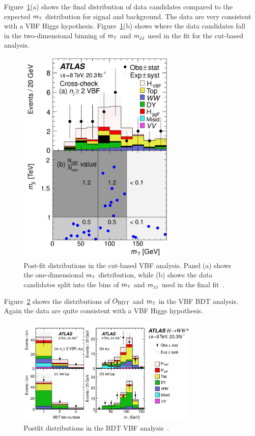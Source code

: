 Figure~\ref{fig:vbf_cb_mt}(a) shows the final distribution of data candidates compared to the expected $m_{\textrm{\footnotesize\sc t}}$ distribution for signal and background. The data are very consistent with a VBF Higgs hypothesis. Figure~\ref{fig:vbf_cb_mt}(b) shows where the data candidates fall in the two-dimensional binning of $m_{\textrm{\footnotesize\sc t}}$ and $m_{jj}$ used in the fit for the cut-based analysis. 
%
\begin{figure}[h!]
  \centering
  \captionsetup{justification=centering}
  \includegraphics[width=0.7\textwidth]{figures/VBF_cb_mt}
  \caption{Post-fit distributions in the cut-based VBF analysis. Panel (a) shows the one-dimensional $m_{\textrm{\footnotesize\sc t}}$ distribution, while (b) shows the data candidates split into the bins of $m_{\textrm{\footnotesize\sc t}}$ and $m_{jj}$ used in the final fit~\cite{WW2015}.}
  \label{fig:vbf_cb_mt}
\end{figure}
%
Figure~\ref{fig:vbf_bdt_mt} shows the distributions of $O_{\rm BDT}$ and $m_{\textrm{\footnotesize\sc t}}$ in the VBF BDT analysis. Again the data are quite consistent with a VBF Higgs hypothesis. 
%
\begin{figure}[h!]
  \centering
  \captionsetup{justification=centering}
  \includegraphics[width=0.8\textwidth]{figures/VBF_bdt_mt}
  \caption{Postfit distributions in the BDT VBF analysis~\cite{WW2015}.}
  \label{fig:vbf_bdt_mt}
\end{figure}

